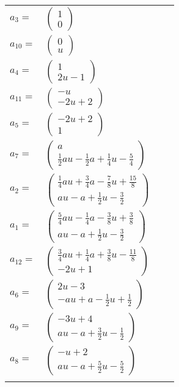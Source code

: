 \documentclass[1p]{elsarticle_modified}
\theoremstyle{definition}
\begin{document}
\begin{tabular}{m{7pt} m{180pt} m{7pt} m{180pt} }
\flushright $a_{3}=$&$\begin{pmatrix}1\\0\end{pmatrix}$ \\
\flushright $a_{10}=$&$\begin{pmatrix}0\\u\end{pmatrix}$ \\
\flushright $a_{4}=$&$\begin{pmatrix}1\\2 u-1\end{pmatrix}$ \\
\flushright $a_{11}=$&$\begin{pmatrix}- u\\-2 u+2\end{pmatrix}$ \\
\flushright $a_{5}=$&$\begin{pmatrix}-2 u+2\\1\end{pmatrix}$ \\
\flushright $a_{7}=$&$\begin{pmatrix}a\\\frac{1}{2} a u-\frac{1}{2} a+\frac{1}{4} u-\frac{5}{4}\end{pmatrix}$ \\
\flushright $a_{2}=$&$\begin{pmatrix}\frac{1}{4} a u+\frac{3}{4} a-\frac{7}{8} u+\frac{15}{8}\\a u- a+\frac{1}{2} u-\frac{3}{2}\end{pmatrix}$ \\
\flushright $a_{1}=$&$\begin{pmatrix}\frac{5}{4} a u-\frac{1}{4} a-\frac{3}{8} u+\frac{3}{8}\\a u- a+\frac{1}{2} u-\frac{3}{2}\end{pmatrix}$ \\
\flushright $a_{12}=$&$\begin{pmatrix}\frac{3}{4} a u+\frac{1}{4} a+\frac{3}{8} u-\frac{11}{8}\\-2 u+1\end{pmatrix}$ \\
\flushright $a_{6}=$&$\begin{pmatrix}2 u-3\\- a u+a-\frac{1}{2} u+\frac{1}{2}\end{pmatrix}$ \\
\flushright $a_{9}=$&$\begin{pmatrix}-3 u+4\\a u- a+\frac{3}{2} u-\frac{1}{2}\end{pmatrix}$ \\
\flushright $a_{8}=$&$\begin{pmatrix}- u+2\\a u- a+\frac{5}{2} u-\frac{5}{2}\end{pmatrix}$\\&\end{tabular}
\end{document}
